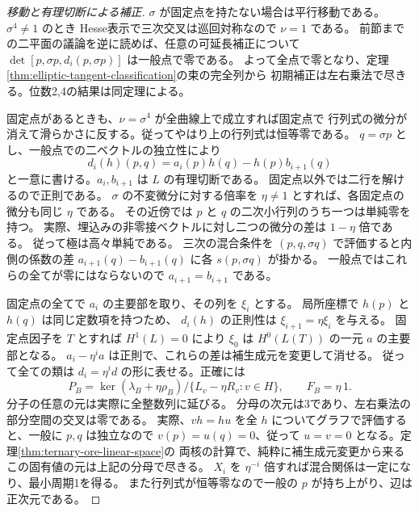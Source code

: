 \begin{proof}[移動と有理切断による補正]
$\sigma$ が固定点を持たない場合は平行移動である。$\sigma^4\ne1$ のとき
Hesse表示で三次交叉は巡回対称なので $\nu=1$ である。
前節までの二平面の議論を逆に読めば、任意の可延長補正について
$\det[p,\sigma p,d_i(p,\sigma p)]$ は一般点で零である。
よって全点で零となり、定理\ref{thm:elliptic-tangent-classification}の束の完全列から
初期補正は左右乗法で尽きる。位数2,4の結果は同定理による。

固定点があるときも、$\nu=\sigma^4$ が全曲線上で成立すれば固定点で
行列式の微分が消えて滑らかさに反する。従ってやはり上の行列式は恒等零である。
$q=\sigma p$ とし、一般点での二ベクトルの独立性により
\[
    d_i(h)(p,q)=a_i(p)h(q)-h(p)b_{i+1}(q)
\]
と一意に書ける。$a_i,b_{i+1}$ は $L$ の有理切断である。
固定点以外では二行を解けるので正則である。
$\sigma$ の不変微分に対する倍率を $\eta\ne1$ とすれば、各固定点の微分も同じ $\eta$ である。
その近傍では $p$ と $q$ の二次小行列のうち一つは単純零を持つ。
実際、埋込みの非零接ベクトルに対し二つの微分の差は $1-\eta$ 倍である。
従って極は高々単純である。
三次の混合条件を $(p,q,\sigma q)$ で評価すると内側の係数の差
$a_{i+1}(q)-b_{i+1}(q)$ に各 $s(p,\sigma q)$ が掛かる。
一般点ではこれらの全てが零にはならないので $a_{i+1}=b_{i+1}$ である。

固定点の全てで $a_i$ の主要部を取り、その列を $\xi_i$ とする。
局所座標で $h(p)$ と $h(q)$ は同じ定数項を持つため、
$d_i(h)$ の正則性は $\xi_{i+1}=\eta\xi_i$ を与える。
固定点因子を $T$ とすれば $H^1(L)=0$ により
$\xi_0$ は $H^0(L(T))$ の一元 $a$ の主要部となる。
$a_i-\eta^i a$ は正則で、これらの差は補生成元を変更して消せる。
従って全ての類は $d_i=\eta^i d$ の形に表せる。正確には
\[
        P_B=\ker(\lambda_B+\eta\rho_B)/
                 \{L_v-\eta R_v:v\in H\},\qquad F_B=\eta\,1 .
\]
分子の任意の元は実際に全整数列に延びる。
分母の次元は3であり、左右乗法の部分空間の交叉は零である。
実際、$vh=hu$ を全 $h$ についてグラフで評価すると、一般に $p,q$ は独立なので
$v(p)=u(q)=0$、従って $u=v=0$ となる。定理\ref{thm:ternary-ore-linear-space}の
両核の計算で、純粋に補生成元変更から来るこの固有値の元は上記の分母で尽きる。
$X_i$ を $\eta^{-i}$ 倍すれば混合関係は一定になり、最小周期1を得る。
また行列式が恒等零なので一般の $p$ が持ち上がり、辺は正次元である。
\end{proof}


